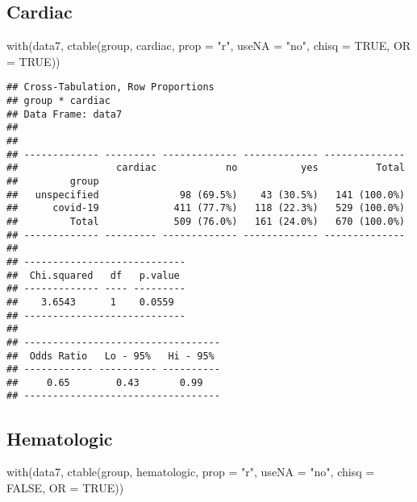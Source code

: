 \documentclass[
]{article}
\newenvironment{Shaded}{\begin{snugshade}}{\end{snugshade}}
\newcommand{\AttributeTok}[1]{\textcolor[rgb]{0.77,0.63,0.00}{#1}}
\newcommand{\ConstantTok}[1]{\textcolor[rgb]{0.00,0.00,0.00}{#1}}
\newcommand{\FunctionTok}[1]{\textcolor[rgb]{0.00,0.00,0.00}{#1}}
\newcommand{\NormalTok}[1]{#1}
\newcommand{\StringTok}[1]{\textcolor[rgb]{0.31,0.60,0.02}{#1}}
\begin{document}
\hypertarget{cardiac}{%
\subsection{Cardiac}\label{cardiac}}

\begin{Shaded}
\begin{Highlighting}[]
\FunctionTok{with}\NormalTok{(data7, }\FunctionTok{ctable}\NormalTok{(group, cardiac, }\AttributeTok{prop =} \StringTok{"r"}\NormalTok{, }\AttributeTok{useNA =} \StringTok{"no"}\NormalTok{, }\AttributeTok{chisq =} \ConstantTok{TRUE}\NormalTok{, }\AttributeTok{OR =} \ConstantTok{TRUE}\NormalTok{))}
\end{Highlighting}
\end{Shaded}

\begin{verbatim}
## Cross-Tabulation, Row Proportions  
## group * cardiac  
## Data Frame: data7  
## 
## 
## ------------- --------- ------------- ------------- --------------
##                 cardiac            no           yes          Total
##         group                                                     
##   unspecified              98 (69.5%)    43 (30.5%)   141 (100.0%)
##      covid-19             411 (77.7%)   118 (22.3%)   529 (100.0%)
##         Total             509 (76.0%)   161 (24.0%)   670 (100.0%)
## ------------- --------- ------------- ------------- --------------
## 
## ----------------------------
##  Chi.squared   df   p.value 
## ------------- ---- ---------
##    3.6543      1    0.0559  
## ----------------------------
## 
## ----------------------------------
##  Odds Ratio   Lo - 95%   Hi - 95% 
## ------------ ---------- ----------
##     0.65        0.43       0.99   
## ----------------------------------
\end{verbatim}

\hypertarget{hematologic}{%
\subsection{Hematologic}\label{hematologic}}

\begin{Shaded}
\begin{Highlighting}[]
\FunctionTok{with}\NormalTok{(data7, }\FunctionTok{ctable}\NormalTok{(group, hematologic, }\AttributeTok{prop =} \StringTok{"r"}\NormalTok{, }\AttributeTok{useNA =} \StringTok{"no"}\NormalTok{, }\AttributeTok{chisq =} \ConstantTok{FALSE}\NormalTok{, }\AttributeTok{OR =} \ConstantTok{TRUE}\NormalTok{))}
\end{Highlighting}
\end{Shaded}
\end{document}
